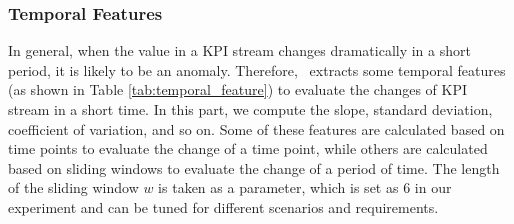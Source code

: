 \subsubsection{Temporal Features}
\label{subsubsubsec:temporal_features}
In general, when the value in a KPI stream changes dramatically in a short period, it is likely to be an anomaly. Therefore, \name~extracts some temporal features (as shown in Table \ref{tab:temporal_feature}) to evaluate the changes of KPI stream in a short time.
In this part, we compute the slope, standard deviation, coefficient of variation, and so on. Some of these features are calculated based on time points to evaluate the change of a time point, while others are calculated based on sliding windows to evaluate the change of a period of time. The length of the sliding window $w$ is taken as a parameter, which is set as 6 in our experiment and can be tuned for different scenarios and requirements.
